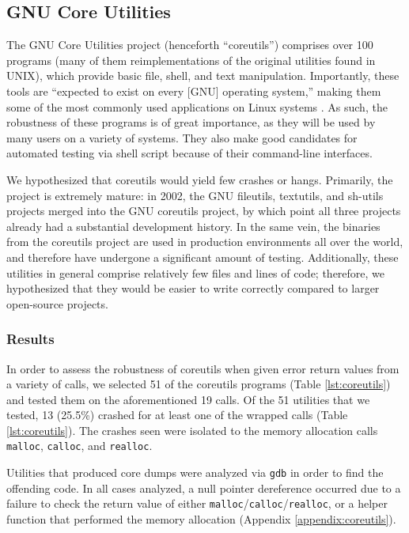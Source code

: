 \subsection{GNU Core Utilities}
The GNU Core Utilities project (henceforth ``coreutils'') comprises over 100 programs (many of them reimplementations of the original utilities found in UNIX), which provide basic file, shell, and text manipulation. Importantly, these tools are ``expected to exist on every [GNU] operating system,'' making them some of the most commonly used applications on Linux systems \cite{coreutils}. As such, the robustness of these programs is of great importance, as they will be used by many users on a variety of systems. They also make good candidates for automated testing via shell script because of their command-line interfaces.

We hypothesized that coreutils would yield few crashes or hangs. Primarily, the project is extremely mature: in 2002, the GNU fileutils, textutils, and sh-utils projects merged into the GNU coreutils project, by which point all three projects already had a substantial development history. In the same vein, the binaries from the coreutils project are used in production environments all over the world, and therefore have undergone a significant amount of testing. Additionally, these utilities in general comprise relatively few files and lines of code; therefore, we hypothesized that they would be easier to write correctly compared to larger open-source projects.

\subsubsection{Results}
In order to assess the robustness of coreutils when given error return values from a variety of calls, we selected 51 of the coreutils programs (Table \ref{lst:coreutils}) and tested them on the aforementioned 19 calls. Of the 51 utilities that we tested, 13 (25.5\%) crashed for at least one of the wrapped calls (Table \ref{lst:coreutils}). The crashes seen were isolated to the memory allocation calls \texttt{malloc}, \texttt{calloc}, and \texttt{realloc}. 

Utilities that produced core dumps were analyzed via \texttt{gdb} in order to find the offending code. In all cases analyzed, a null pointer dereference occurred due to a failure to check the return value of either \texttt{malloc}/\texttt{calloc}/\texttt{realloc}, or a helper function that performed the memory allocation (Appendix \ref{appendix:coreutils}).

